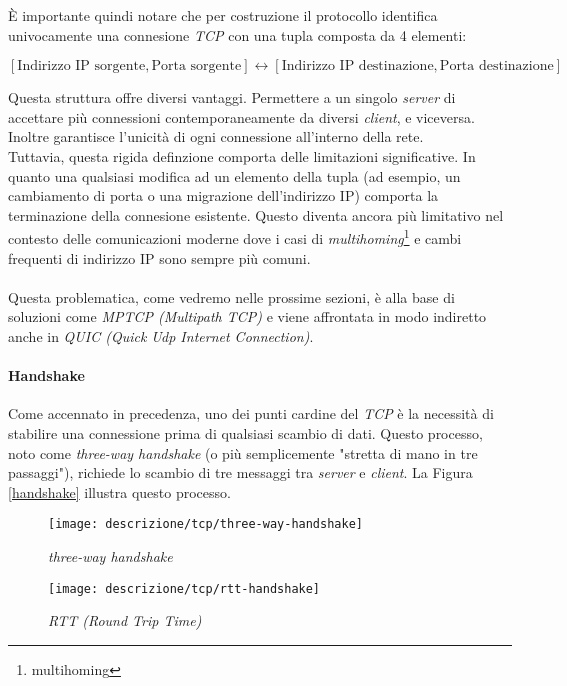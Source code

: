 \noindent È importante quindi notare che per costruzione il protocollo identifica univocamente una connesione \emph{TCP} con una tupla composta da 4 elementi:

\begin{center}
    \small
    $[\text{Indirizzo IP sorgente}, \text{Porta sorgente}] \leftrightarrow [\text{Indirizzo IP destinazione}, \text{Porta destinazione}]$
\end{center}

\noindent Questa struttura offre diversi vantaggi. Permettere a un singolo \emph{server} di accettare più connessioni contemporaneamente da diversi \emph{client}, e viceversa. 
Inoltre garantisce l'unicità di ogni connessione all'interno della rete.
\\
Tuttavia, questa rigida definzione comporta delle limitazioni significative. In quanto una qualsiasi modifica ad un elemento della tupla (ad esempio, un cambiamento di porta o una migrazione dell'indirizzo IP) comporta la terminazione della connesione esistente. Questo diventa ancora più limitativo nel contesto delle comunicazioni moderne dove i casi di \emph{multihoming}\footnote{\gls{multihoming}} e cambi frequenti di indirizzo IP sono sempre più comuni.
\\
\\
Questa problematica, come vedremo nelle prossime sezioni, è alla base di soluzioni come \emph{MPTCP (Multipath TCP)} e viene affrontata in modo indiretto anche in \emph{QUIC (Quick Udp Internet Connection)}.

\paragraph{ Handshake }

\noindent Come accennato in precedenza, uno dei punti cardine del \emph{TCP} è la necessità di stabilire una connessione prima di qualsiasi scambio di dati. Questo processo, noto come \emph{three-way handshake} (o più semplicemente "stretta di mano in tre passaggi"), richiede lo scambio di tre messaggi tra \emph{server} e \emph{client}. La Figura \ref{handshake} illustra questo processo.

\begin{figure}[!h]
    \centering
    \begin{minipage}{0.48\textwidth}
        \centering
        \texttt{[image: descrizione/tcp/three-way-handshake]}
        \caption{\emph{three-way handshake}}
        \label{handshake}
    \end{minipage}
    \hfill
    \begin{minipage}{0.48\textwidth}
        \centering
        \texttt{[image: descrizione/tcp/rtt-handshake]}
        \caption{\emph{RTT (Round Trip Time)}}
        \label{rtt}
    \end{minipage}
\end{figure}

